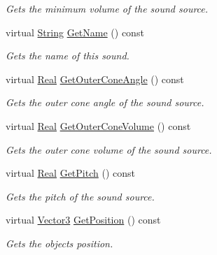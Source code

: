 \begin{DoxyCompactItemize}
\begin{DoxyCompactList}\small\item\em Gets the minimum volume of the sound source. \item\end{DoxyCompactList}\item 
virtual \hyperlink{namespaceMezzanine_acf9fcc130e6ebf08e3d8491aebcf1c86}{String} \hyperlink{classMezzanine_1_1Audio_1_1Sound_a42cf89caec563b8fe86ef65234f2badf}{GetName} () const 
\begin{DoxyCompactList}\small\item\em Gets the name of this sound. \item\end{DoxyCompactList}\item 
virtual \hyperlink{namespaceMezzanine_a726731b1a7df72bf3583e4a97282c6f6}{Real} \hyperlink{classMezzanine_1_1Audio_1_1Sound_a9dd34a98907ed664b1cb94992925d518}{GetOuterConeAngle} () const 
\begin{DoxyCompactList}\small\item\em Gets the outer cone angle of the sound source. \item\end{DoxyCompactList}\item 
virtual \hyperlink{namespaceMezzanine_a726731b1a7df72bf3583e4a97282c6f6}{Real} \hyperlink{classMezzanine_1_1Audio_1_1Sound_a9257d5e2a6233fda79a19a170f3f5533}{GetOuterConeVolume} () const 
\begin{DoxyCompactList}\small\item\em Gets the outer cone volume of the sound source. \item\end{DoxyCompactList}\item 
virtual \hyperlink{namespaceMezzanine_a726731b1a7df72bf3583e4a97282c6f6}{Real} \hyperlink{classMezzanine_1_1Audio_1_1Sound_a95876ef2df75b0f780c06b6abd0e134f}{GetPitch} () const 
\begin{DoxyCompactList}\small\item\em Gets the pitch of the sound source. \item\end{DoxyCompactList}\item 
virtual \hyperlink{classMezzanine_1_1Vector3}{Vector3} \hyperlink{classMezzanine_1_1Audio_1_1Sound_a9d4712b50c270c34446d238855b4a73f}{GetPosition} () const 
\begin{DoxyCompactList}\small\item\em Gets the objects position. \item\end{DoxyCompactList}\item 

\end{DoxyCompactItemize}
